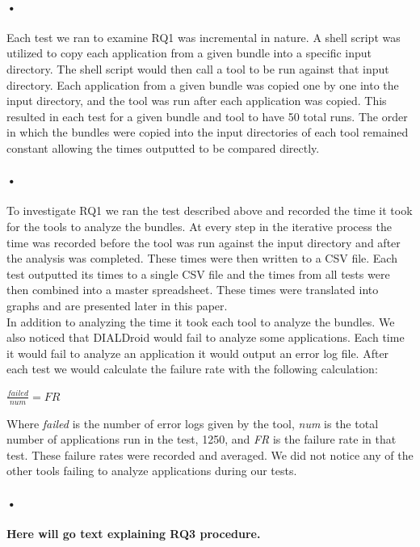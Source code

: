 \documentclass[twocolumn]{article}
\begin{document}
\paragraph{•}
	Each test we ran to examine RQ1 was incremental in nature. A shell script was utilized to copy each application from a given bundle into a specific input directory. The shell script would then call a tool to be run against that input directory. Each application from a given bundle was copied one by one into the input directory, and the tool was run after each application was copied. This resulted in each test for a given bundle and tool to have 50 total runs. The order in which the bundles were copied into the input directories of each tool remained constant allowing the times outputted to be compared directly. 
\paragraph{•}
	To investigate RQ1 we ran the test described above and recorded the time it took for the tools to analyze the bundles. At every step in the iterative process the time was recorded before the tool was run against the input directory and after the analysis was completed. These times were then written to a CSV file. Each test outputted its times to a single CSV file and the times from all tests were then combined into a master spreadsheet. These times were translated into graphs and are presented later in this paper.\\
	In addition to analyzing the time it took each tool to analyze the bundles. We also noticed that DIALDroid would fail to analyze some applications. Each time it would fail to analyze an application it would output an error log file. After each test we would calculate the failure rate with the following calculation:\\
	\begin{center}
		\(\frac{failed}{num}=FR\)
	\end{center}
	Where \textit{failed} is the number of error logs given by the tool, \textit{num} is the total number of applications run in the test, 1250, and \textit{FR} is the failure rate  in that test. These failure rates were recorded and averaged. We did not notice any of the other tools failing to analyze applications during our tests.
\paragraph{•}
	
	\textbf{Here will go text explaining RQ3 procedure.}
\end{document}
